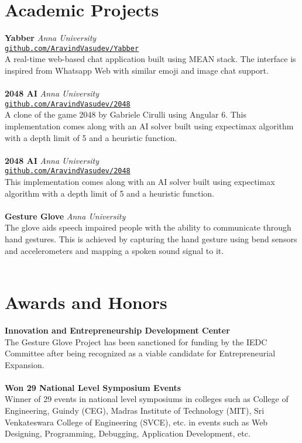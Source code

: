 \documentclass{resume}
\begin{document}
\begin{multicols*}{2}
\section*{Academic Projects}
\noindent
\textbf{Yabber} \hfill \textit{Anna University} \\
\texttt{\small \href{https://github.com/AravindVasudev/Yabber}{github.com/AravindVasudev/Yabber}} \\
A real-time web-based chat application built using MEAN stack. The interface is inspired from Whatsapp Web with similar emoji and image chat support. \\
\\
\textbf{2048 AI} \hfill \textit{Anna University} \\
\texttt{\small \href{https://github.com/AravindVasudev/2048}{github.com/AravindVasudev/2048}} \\
A clone of the game 2048 by Gabriele Cirulli using Angular 6. This implementation comes along with an AI solver built using expectimax algorithm with a depth limit of 5 and a heuristic function. \\
\\
\textbf{2048 AI} \hfill \textit{Anna University} \\
\texttt{\small \href{https://github.com/AravindVasudev/2048}{github.com/AravindVasudev/2048}} \\
This implementation comes along with an AI solver built using expectimax algorithm with a depth limit of 5 and a heuristic function. \\
\\
\textbf{Gesture Glove} \hfill \textit{Anna University} \\
The glove aids speech impaired people with the ability to communicate through hand gestures. This is achieved by capturing the hand gesture using bend sensors and accelerometers and mapping a spoken sound signal to it. \\
\\

\section*{Awards and Honors}
\textbf{Innovation and Entrepreneurship Development Center} \\
The Gesture Glove Project has been sanctioned for funding by the IEDC Committee after being recognized as a viable candidate for Entrepreneurial Expansion. \\
\\
\textbf{Won 29 National Level Symposium Events} \\
Winner of 29 events in national level symposiums in colleges such as College of Engineering, Guindy (CEG), Madras Institute of Technology (MIT), Sri Venkateswara College of Engineering (SVCE), etc. in events such as Web Designing, Programming, Debugging, Application Development, etc. \\
\\
\end{multicols*}
\end{document}
